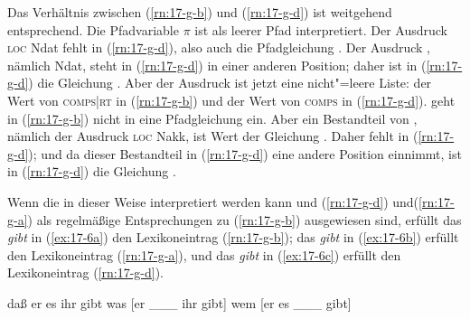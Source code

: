 \documentclass[output=paper]{LSP/langsci}
\begin{document}
\randnum\label{rn:17-58}Das Verhältnis zwischen (\ref{rn:17-g-b}) und (\ref{rn:17-g-d}) ist weitgehend entsprechend. Die Pfadvariable $\pi$ ist als leerer Pfad
interpretiert. Der Ausdruck {\glqq}\textsc{loc} Ndat{\grqq} fehlt in (\ref{rn:17-g-d}),
also auch die Pfadgleichung . Der Ausdruck , nämlich
{\glqq}Ndat{\grqq}, steht in (\ref{rn:17-g-d}) in einer anderen Position; daher ist
in (\ref{rn:17-g-d}) die Gleichung . Aber der Ausdruck  ist jetzt eine nicht"=leere Liste: der Wert von \textsc{comps|rt} in (\ref{rn:17-g-b}) und der Wert von \textsc{comps} in (\ref{rn:17-g-d}).  geht in (\ref{rn:17-g-b}) nicht in eine Pfadgleichung ein. Aber ein Bestandteil von , nämlich der Ausdruck
{\glqq}\textsc{loc} Nakk{\grqq}, ist Wert der Gleichung . Daher fehlt 
in (\ref{rn:17-g-d}); und da dieser Bestandteil in (\ref{rn:17-g-d}) eine andere Position
einnimmt, ist in (\ref{rn:17-g-d}) die Gleichung .

\randnum\label{rn:17-59}Wenn die  in dieser Weise interpretiert werden
kann und (\ref{rn:17-g-d}) und\linebreak (\ref{rn:17-g-a}) als regelmäßige Entsprechungen zu (\ref{rn:17-g-b}) ausgewiesen sind, erfüllt das \textit{gibt} in (\ref{ex:17-6a}) den Lexikoneintrag (\ref{rn:17-g-b}); das \textit{gibt} in (\ref{ex:17-6b}) erfüllt den Lexikoneintrag (\ref{rn:17-g-a}), und das \textit{gibt} in (\ref{ex:17-6c})
erfüllt den Lexikoneintrag (\ref{rn:17-g-d}).
\begin{exe}
\ex
\label{ex:17-6}
\begin{xlist}
\ex
\label{ex:17-6a}
daß er es ihr gibt
\ex
\label{ex:17-6b}
was [er \_\_\_ ihr gibt]
\ex
\label{ex:17-6c}
wem [er es \_\_\_ gibt]
\end{xlist}
\end{exe}
\end{document}
